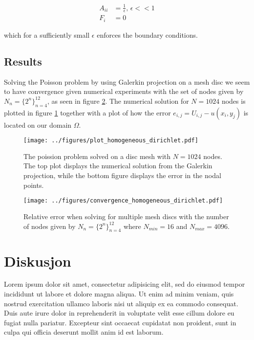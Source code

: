 \documentclass[5p,a4paper,english]{elsarticle}%
\begin{document}
\begin{equation*}
    \begin{aligned}
    A_{ii} &= \frac{1}{\epsilon}, \, \epsilon << 1 \\
    F_i &= 0
    \end{aligned}
\end{equation*}

which for a sufficiently small $\epsilon$ enforces the boundary conditions.


\subsection{Results}

Solving the Poisson problem by using Galerkin projection on a mesh disc we seem to have convergence given numerical experiments with
the set of nodes given by $N_n = \{ 2^n\}_{n=4}^{12}$, as seen in figure \ref{convergence}. The numerical solution for $N = 1024$ nodes is plotted in figure \ref{solution-error}
together with a plot of how the error $e_{i,j} = U_{i,j} - u(x_i,y_j)$ is located on our domain $\Omega$.

\begin{figure}[tbp]
    \centering
        \texttt{[image: ../figures/plot\_homogeneous\_dirichlet.pdf]}
    \caption{The poission problem solved on a disc mesh with $N = 1024$ nodes.
    The top plot displays the numerical solution from the Galerkin projection,
    while the bottom figure displays the error in the nodal points.}
    \label{solution-error}
\end{figure}

\begin{figure}[tbp]
    \centering
        \texttt{[image: ../figures/convergence\_homogeneous\_dirichlet.pdf]}
    \caption{Relative error when solving for multiple mesh discs with the number of nodes given by $N_n = \{ 2^n\}_{n=4}^{12}$
    where $N_{min} = 16$ and $N_{max} = 4096$.}
    \label{convergence}
\end{figure}


\section{Diskusjon}
Lorem ipsum dolor sit amet, consectetur adipisicing elit, sed do eiusmod tempor incididunt ut labore et dolore magna aliqua. Ut enim ad minim veniam, quis nostrud exercitation ullamco laboris nisi ut aliquip ex ea commodo consequat. Duis aute irure dolor in reprehenderit in voluptate velit esse cillum dolore eu fugiat nulla pariatur. Excepteur sint occaecat cupidatat non proident, sunt in culpa qui officia deserunt mollit anim id est laborum.
\end{document}
